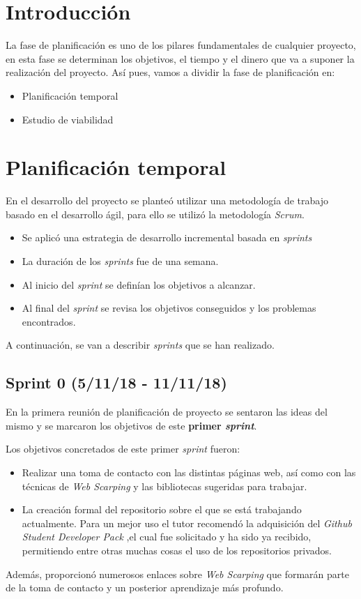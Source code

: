 
\section{Introducción}
La fase de planificación es uno de los pilares fundamentales de cualquier proyecto, en esta fase se determinan los objetivos, el tiempo y el dinero que va a suponer la realización del proyecto. Así pues, vamos a dividir la fase de planificación en:
\begin{itemize}
	\item Planificación temporal
	\item Estudio de viabilidad
\end{itemize}
\section{Planificación temporal}
En el desarrollo del proyecto se planteó utilizar una metodología de trabajo basado en el desarrollo ágil, para ello se utilizó la metodología \emph{Scrum}.
\begin{itemize}
	\item Se aplicó una estrategia de desarrollo incremental basada en \emph{sprints}
	\item La duración de los \emph{sprints} fue de una semana.
	\item Al inicio del \emph{sprint} se definían los objetivos a alcanzar.
	\item Al final del \emph{sprint} se revisa los objetivos conseguidos y los problemas encontrados.
\end{itemize}
A continuación, se van a describir \emph{sprints} que se han realizado.

\subsection{Sprint 0 (5/11/18 - 11/11/18)}
En la primera reunión de planificación de proyecto se sentaron las ideas del mismo y se marcaron los objetivos de este \textbf{primer \emph{sprint}}.

Los objetivos concretados de este primer \emph{sprint} fueron:
\begin{itemize}
	\item Realizar una toma de contacto con las distintas páginas web, así como con las técnicas de \emph{Web Scarping} y las bibliotecas sugeridas para trabajar.
	\item La creación formal del repositorio sobre el que se está trabajando actualmente. Para un mejor uso el tutor recomendó la adquisición del \emph{Github Student Developer Pack} ,el cual fue solicitado y ha sido ya recibido, permitiendo entre otras muchas cosas el uso de los repositorios privados.
\end{itemize}
Además, proporcionó numerosos enlaces sobre \emph{Web Scarping} que formarán parte de la toma de contacto y un posterior aprendizaje más profundo.


